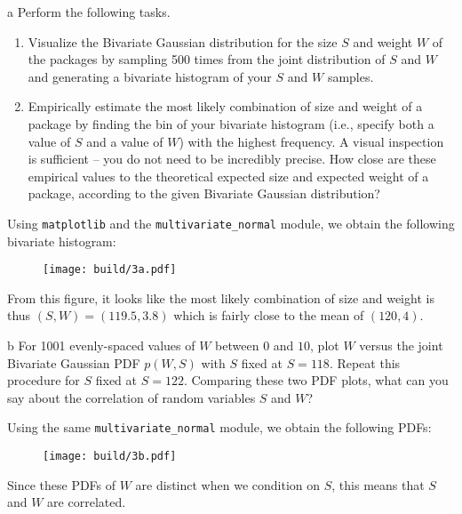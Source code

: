 \documentclass[expanded]{lkx_pset}
\begin{document}
\begin{parts}
  \begin{part}{a}
    Perform the following tasks.

    \begin{enumerate}
        \item Visualize the Bivariate Gaussian distribution for the size $S$ and weight $W$ of the packages by sampling 500 times from the joint distribution of $S$ and $W$ and generating a bivariate histogram of your $S$ and $W$ samples.
        \item Empirically estimate the most likely combination of size and weight of a package by finding the bin of your bivariate histogram (i.e., specify both a value of $S$ and a value of $W$) with the highest frequency. A visual inspection is sufficient -- you do not need to be incredibly precise.  How close are these empirical values to the theoretical expected size and expected weight of a package, according to the given Bivariate Gaussian distribution?
    \end{enumerate}
  \end{part}

  Using \texttt{matplotlib} and the \texttt{multivariate\_normal} module, we obtain the following bivariate histogram:

  \begin{figure}[ht]
    \centering
    \texttt{[image: build/3a.pdf]}
  \end{figure}\noindent
  From this figure, it looks like the most likely combination of size and weight is thus $(S,W)=(119.5, 3.8)$ which is fairly close to the mean of $(120, 4)$.

  \begin{part}{b}
     For 1001 evenly-spaced values of $W$ between $0$ and $10$, plot $W$ versus the joint Bivariate Gaussian PDF $p(W, S)$ with $S$ fixed at $S=118$. Repeat this procedure for $S$ fixed at $S=122$. Comparing these two PDF plots, what can you say about the correlation of random variables $S$ and $W$?
  \end{part}

  Using the same \texttt{multivariate\_normal} module, we obtain the following PDFs:

  \begin{figure}[ht]
    \centering
    \texttt{[image: build/3b.pdf]}
  \end{figure}\noindent
  Since these PDFs of $W$ are distinct when we condition on $S$, this means that $S$ and $W$ are correlated.


\end{parts}
\end{document}
